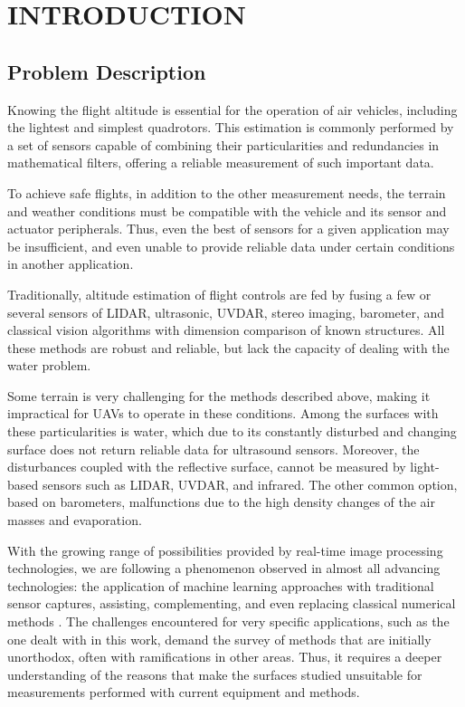 \section{INTRODUCTION}

\subsection{Problem Description}
Knowing the flight altitude is essential for the operation of air vehicles, including the lightest and simplest quadrotors. This estimation is commonly performed by a set of sensors capable of combining their particularities and redundancies in mathematical filters, offering a reliable measurement of such important data.

To achieve safe flights, in addition to the other measurement needs, the terrain and weather conditions must be compatible with the vehicle and its sensor and actuator peripherals. Thus, even the best of sensors for a given application may be insufficient, and even unable to provide reliable data under certain conditions in another application.

Traditionally, altitude estimation of flight controls are fed by fusing a few or several sensors of LIDAR, ultrasonic, UVDAR, stereo imaging, barometer, and classical vision algorithms with dimension comparison of known structures.
All these methods are robust and reliable, but lack the capacity of dealing with the water problem.

Some terrain is very challenging for the methods described above, making it impractical for UAVs to operate in these conditions. Among the surfaces with these particularities is water, which due to its constantly disturbed and changing surface does not return reliable data for ultrasound sensors. Moreover, the disturbances coupled with the reflective surface, cannot be measured by light-based sensors such as LIDAR, UVDAR, and infrared. The other common option, based on barometers, malfunctions due to the high density changes of the air masses and evaporation.

With the growing range of possibilities provided by real-time image processing technologies, we are following a phenomenon observed in almost all advancing technologies: the application of machine learning approaches with traditional sensor captures, assisting, complementing, and even replacing classical numerical methods \cite{CivilSurvey}. 
The challenges encountered for very specific applications, such as the one dealt with in this work, demand the survey of methods that are initially unorthodox, often with ramifications in other areas.
Thus, it requires a deeper understanding of the reasons that make the surfaces studied unsuitable for measurements performed with current equipment and methods.

